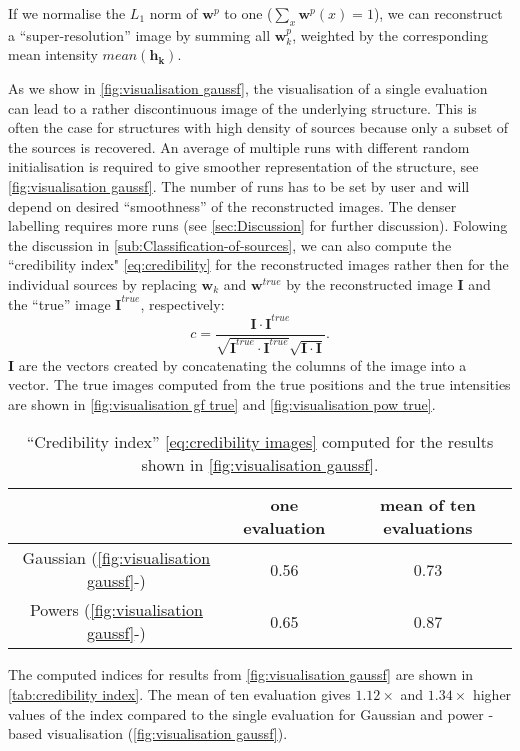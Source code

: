 If we normalise the $L_1$ norm of $\bm{w}^p$ to one ($\sum_x \bm{w}^p(x)=1$), we can reconstruct a ``super-resolution'' image by summing all $\bm{w}_k^p$, weighted by the corresponding mean intensity $\unit{mean}(\bm{h_k})$. 

As we show in \autoref{fig:visualisation gaussf}\ddd, the visualisation of a single \inmf{} evaluation can lead to a rather discontinuous image of the underlying structure. This is often the case for structures with high density of sources because only a subset of the sources is recovered. An average of multiple \inmf{} runs with different random initialisation is required to give smoother representation of the structure, see \autoref{fig:visualisation gaussf}\ddd. The number of \inmf{} runs has to be set by user and will depend on desired ``smoothness'' of the reconstructed images. The denser labelling requires more \inmf{} runs (see \autoref{sec:Discussion} for further discussion). Folowing the discussion in \autoref{sub:Classification-of-sources}, we can also compute the ``credibility index" \autoref{eq:credibility} for the reconstructed images rather then for the individual sources by replacing $\bm{w}_k$ and $\bm{w}^{true}$ by the reconstructed image $\bm{I}$ and the ``true'' image $\bm{I}^{true}$, respectively:
%
\begin{equation}
	c=\frac{\bm{I}\cdot\bm{I}^{true}}{\sqrt{\bm{I}^{true}\cdot\bm{I}^{true}}\sqrt{\bm{I}\cdot\bm{I}}}.
	\label{eq:credibility images}
\end{equation} 
%
$\bm{I}$ are the vectors created by concatenating the columns of the image into a vector. The true images computed from the true positions and the true intensities are shown in \autoref{fig:visualisation gf true} and \autoref{fig:visualisation pow true}. 
%
\begin{table}[!h]
	\begin{tabular}{|c|c|c|}
		\hline
						& one \inmf{} evaluation & mean of ten \inmf{} evaluations\\ \hline
		
		Gaussian (\autoref{fig:visualisation gaussf}\aaa-\ccc)		& 0.56  	& 0.73\\ \hline
		Powers (\autoref{fig:visualisation gaussf}\ddd-\fff)		& 0.65  	& 0.87\\ \hline		
	\end{tabular}
 	\caption{``Credibility index'' \autoref{eq:credibility images} computed for the results shown in \autoref{fig:visualisation gaussf}.  \label{tab:credibility index}}
\end{table}
%
The computed indices for results from \autoref{fig:visualisation gaussf}  are shown in \autoref{tab:credibility index}. The mean of ten \inmf{} evaluation gives $1.12\times$ and $1.34\times$ higher values of the index compared to the single evaluation for Gaussian and power - based visualisation (\autoref{fig:visualisation gaussf}). 

